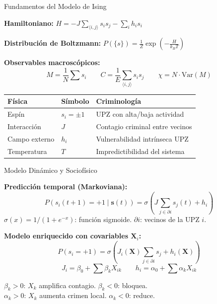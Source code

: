 \documentclass[11pt]{beamer}
\begin{document}
\begin{frame}{Fundamentos del Modelo de Ising}

\textbf{Hamiltoniano:} $\displaystyle H = -J \sum_{\langle i,j \rangle} s_i s_j - \sum_i h_i s_i$

\vspace{0.2cm}
\textbf{Distribución de Boltzmann:} $\displaystyle P(\{s\}) = \frac{1}{Z} \exp\!\left(-\frac{H}{k_B T}\right)$

\vspace{0.3cm}
\textbf{Observables macroscópicos:}
\[
M = \frac{1}{N}\sum s_i \qquad
C = \frac{1}{E}\sum_{\langle i,j \rangle} s_i s_j \qquad
\chi = N \cdot \text{Var}(M)
\]

\vspace{0.3cm}
\begin{table}[h]
\centering
\small
\begin{tabular}{l l l}
\toprule
\textbf{Física} & \textbf{Símbolo} & \textbf{Criminología} \\
\midrule
Espín & $s_i = \pm 1$ & UPZ con alta/baja actividad \\
Interacción & $J$ & Contagio criminal entre vecinos \\
Campo externo & $h_i$ & Vulnerabilidad intrínseca UPZ \\
Temperatura & $T$ & Impredictibilidad del sistema \\
\bottomrule
\end{tabular}
\end{table}
\end{frame}

\begin{frame}{Modelo Dinámico y Sociofísico}

\textbf{Predicción temporal (Markoviana):}
\[
P(s_i(t+1)=+1 \mid \mathbf{s}(t)) = \sigma\!\left(J \sum_{j \in \partial i} s_j(t) + h_i\right)
\]
$\sigma(x) = 1/(1+e^{-x})$: función sigmoide. $\partial i$: vecinos de la UPZ $i$.

\vspace{0.3cm}
\textbf{Modelo enriquecido con covariables $\mathbf{X}_i$:}
\[
P(s_i=+1) = \sigma\!\left(J_i(\mathbf{X}) \sum_{j \in \partial i} s_j + h_i(\mathbf{X})\right)
\]
\[
J_i = \beta_0 + \sum \beta_k X_{ik} \qquad
h_i = \alpha_0 + \sum \alpha_k X_{ik}
\]

\vspace{0.2cm}
$\beta_k > 0$: $X_k$ amplifica contagio. $\beta_k < 0$: bloquea.\\
$\alpha_k > 0$: $X_k$ aumenta crimen local. $\alpha_k < 0$: reduce.
\end{frame}
\end{document}
